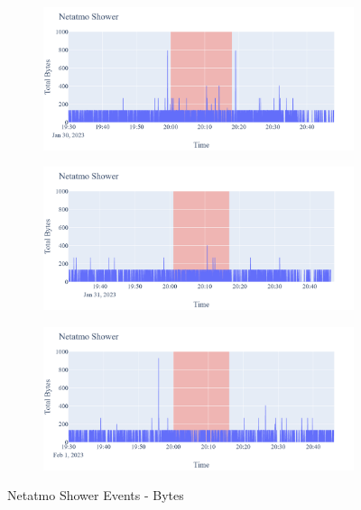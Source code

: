 \begin{figure}[H]
\begin{subfigure}[b]{0.47\textwidth}
    \end{subfigure}
    \begin{subfigure}[b]{0.47\textwidth}
        \centering
        \includegraphics[width=1.2\hsize]{figures/Netatmo_Shower_Bytes_30.01.png}
    \end{subfigure}
    \begin{subfigure}[b]{0.47\textwidth}
        \centering
        \includegraphics[width=1.2\hsize]{figures/Netatmo_Shower_Bytes_31.01.png}
    \end{subfigure}
    \hspace{0.6cm}
    \begin{subfigure}[b]{0.47\textwidth}
        \centering
        \includegraphics[width=1.2\hsize]{figures/Netatmo_Shower_Bytes_01.02.png}
    \end{subfigure}
    \caption{Netatmo Shower Events - Bytes}
    \label{fig:NetatmoShowerBytes}
\end{figure}

